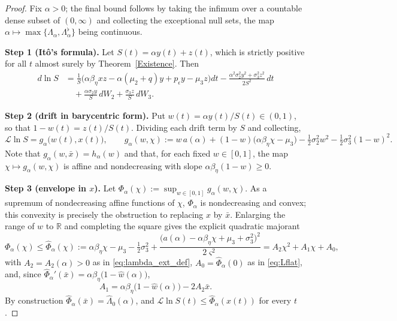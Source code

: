 \documentclass[10pt,a4paper]{amsart}
\newcommand{\betaeta}{\beta_\eta}
\newcommand{\peps}{p_\epsilon}
\begin{document}
\begin{proof}
Fix $\alpha>0$; the final bound follows by taking the infimum over a countable dense subset of $(0,\infty)$ and collecting the exceptional null sets, the map $\alpha\mapsto\max\{\Lambda_\alpha,\Lambda_\alpha^\flat\}$ being continuous.

\textbf{Step 1 (It\^o's formula).} Let $S(t)=\alpha y(t)+z(t)$, which is strictly positive for all $t$ almost surely by Theorem~\ref{Existence}. Then
\begin{align}\label{eq:dV_ext}
d\ln S &= \frac{1}{S}\Big(\alpha\betaeta xz-\alpha(\mu_2+q)y+\peps y-\mu_3z\Big)dt-\frac{\alpha^2\sigma_2^2y^2+\sigma_3^2z^2}{2S^2}\,dt \nonumber\\
&\quad+\frac{\alpha\sigma_2y}{S}\,dW_2+\frac{\sigma_3z}{S}\,dW_3 .
\end{align}

\textbf{Step 2 (drift in barycentric form).} Put $w(t)=\alpha y(t)/S(t)\in(0,1)$, so that $1-w(t)=z(t)/S(t)$. Dividing each drift term by $S$ and collecting,
\begin{equation}\label{eq:LV_w}
\mathcal{L}\ln S = g_\alpha\big(w(t),x(t)\big),\qquad
g_\alpha(w,\chi):=w\,a(\alpha)+(1-w)\big(\alpha\betaeta\chi-\mu_3\big)-\tfrac12\sigma_2^2w^2-\tfrac12\sigma_3^2(1-w)^2 .
\end{equation}
Note that $g_\alpha(w,\bar x)=h_\alpha(w)$ and that, for each fixed $w\in[0,1]$, the map $\chi\mapsto g_\alpha(w,\chi)$ is affine and nondecreasing with slope $\alpha\betaeta(1-w)\ge0$.

\textbf{Step 3 (envelope in $x$).} Let $\Phi_\alpha(\chi):=\sup_{w\in[0,1]}g_\alpha(w,\chi)$. As a supremum of nondecreasing affine functions of $\chi$, $\Phi_\alpha$ is nondecreasing and convex; this convexity is precisely the obstruction to replacing $x$ by $\bar x$. Enlarging the range of $w$ to $\mathbb{R}$ and completing the square gives the explicit quadratic majorant
\begin{equation}\label{eq:Phihat}
\Phi_\alpha(\chi)\le\widehat\Phi_\alpha(\chi):=\alpha\betaeta\chi-\mu_3-\tfrac12\sigma_3^2+\frac{\big(a(\alpha)-\alpha\betaeta\chi+\mu_3+\sigma_3^2\big)^2}{2\varsigma^2}=A_2\chi^2+A_1\chi+A_0 ,
\end{equation}
with $A_2=A_2(\alpha)>0$ as in \eqref{eq:lambda_ext_def}, $A_0=\widehat\Phi_\alpha(0)$ as in \eqref{eq:Lflat}, and, since $\widehat\Phi_\alpha'(\bar x)=\alpha\betaeta\big(1-\widehat w(\alpha)\big)$,
\[
A_1=\alpha\betaeta\big(1-\widehat w(\alpha)\big)-2A_2\bar x .
\]
By construction $\widehat\Phi_\alpha(\bar x)=\widehat\Lambda_0(\alpha)$, and $\mathcal{L}\ln S(t)\le\widehat\Phi_\alpha(x(t))$ for every $t$.


\end{proof}
\end{document}
